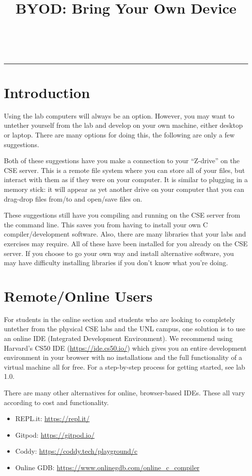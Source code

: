 \documentclass[12pt]{scrartcl}
\title{BYOD: Bring Your Own Device}\let\Title\@title
\subtitle{Developing C on Your Own Machine \\
Computer Science I\\
{\small
\vskip.5cm
Department of Computer Science \& Engineering \\
University of Nebraska--Lincoln}
\vskip-2cm}
\date{~}
\begin{document}
\maketitle

\hrule

\section*{Introduction}

Using the lab computers will always be an option.  However, you may want to
untether yourself from the lab and develop on your own machine, either desktop
or laptop.  There are many options for doing this, the following are only
a few suggestions.

Both of these suggestions have you make a connection to your ``Z-drive'' 
on the CSE server.  This is a remote file system where you can store all
of your files, but interact with them as if they were on your computer.
It is similar to plugging in a memory stick: it will appear as yet another
drive on your computer that you can drag-drop files from/to and open/save
files on.  

These suggestions still have you compiling and running on the CSE server
from the command line.  This saves you from having to install your own C 
compiler/development software.  Also, there are many libraries that your
labs and exercises may require.  All of these have been installed for you
already on the CSE server.  If you choose to go your own way and install
alternative software, you may have difficulty installing libraries if you
don't know what you're doing.

\section{Remote/Online Users}

For students in the online section and students who are looking to 
completely untether from the physical CSE labs and the UNL campus, 
one solution is to use an online IDE (Integrated Development Environment).  
We recommend using Harvard's CS50 IDE (\url{https://ide.cs50.io/}) which
gives you an entire development environment in your browser with no
installations and the full functionality of a virtual machine all for
free.  For a step-by-step process for getting started, see lab 1.0.

There are many other alternatives for online, browser-based IDEs.
These all vary according to cost and functionality.
\begin{itemize}
  \item REPL.it: \url{https://repl.it/}
  \item Gitpod: \url{https://gitpod.io/}
  \item Coddy: \url{https://coddy.tech/playground/c}
  \item Online GDB: \url{https://www.onlinegdb.com/online_c_compiler}
\end{itemize}
\end{document}
